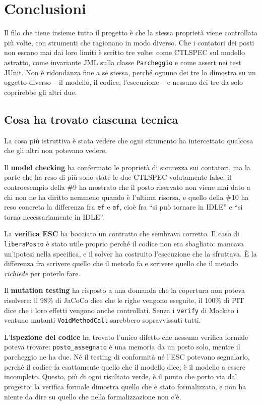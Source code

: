 \section{Conclusioni}

Il filo che tiene insieme tutto il progetto è che la stessa proprietà viene controllata
più volte, con strumenti che ragionano in modo diverso. Che i contatori dei posti non
escano mai dai loro limiti è scritto tre volte: come CTLSPEC sul modello astratto, come
invariante JML sulla classe \texttt{Parcheggio} e come assert nei test JUnit. Non è
ridondanza fine a sé stessa, perché ognuno dei tre lo dimostra su un oggetto diverso --
il modello, il codice, l'esecuzione -- e nessuno dei tre da solo coprirebbe gli altri due.

\subsection*{Cosa ha trovato ciascuna tecnica}

La cosa più istruttiva è stata vedere che ogni strumento ha intercettato qualcosa che gli
altri non potevano vedere.

Il \textbf{model checking} ha confermato le proprietà di sicurezza sui contatori, ma la
parte che ha reso di più sono state le due CTLSPEC volutamente false: il controesempio
della \#9 ha mostrato che il posto riservato non viene mai dato a chi non ne ha diritto
nemmeno quando è l'ultima risorsa, e quello della \#10 ha reso concreta la differenza fra
\texttt{ef} e \texttt{af}, cioè fra ``si può tornare in IDLE'' e ``si torna
necessariamente in IDLE''.

La \textbf{verifica ESC} ha bocciato un contratto che sembrava corretto. Il caso di
\texttt{liberaPosto} è stato utile proprio perché il codice non era sbagliato: mancava
un'ipotesi nella specifica, e il solver ha costruito l'esecuzione che la sfruttava. È la
differenza fra scrivere quello che il metodo fa e scrivere quello che il metodo
\emph{richiede} per poterlo fare.

Il \textbf{mutation testing} ha risposto a una domanda che la copertura non poteva
risolvere: il 98\% di JaCoCo dice che le righe vengono eseguite, il 100\% di PIT dice che
i loro effetti vengono anche controllati. Senza i \texttt{verify} di Mockito i ventuno
mutanti \texttt{VoidMethodCall} sarebbero sopravvissuti tutti.

L'\textbf{ispezione del codice} ha trovato l'unico difetto che nessuna verifica formale
poteva trovare: \texttt{posto\_assegnato} è una memoria da un posto solo, mentre il
parcheggio ne ha due. Né il testing di conformità né l'ESC potevano segnalarlo, perché il
codice fa esattamente quello che il modello dice; è il modello a essere incompleto.
Questo, più di ogni risultato verde, è il punto che porto via dal progetto: la verifica
formale dimostra quello che è stato formalizzato, e non ha niente da dire su quello che
nella formalizzazione non c'è.

